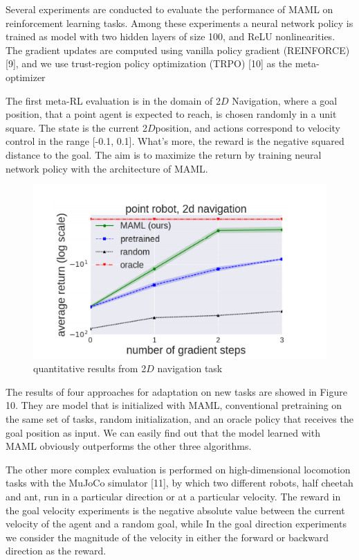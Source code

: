 Several experiments are conducted to evaluate the performance of MAML on reinforcement learning tasks. Among these experiments a neural network policy is trained as model with  two hidden layers of size 100, and ReLU nonlinearities. The gradient updates are computed using vanilla policy gradient (REINFORCE) [9], and we use trust-region policy optimization (TRPO) [10] as the meta-optimizer

The first meta-RL evaluation is in the domain of 2$D$ Navigation, where  a goal position, that a point agent is expected to reach, is chosen randomly in a unit square. The state is the current 2$D$position, and actions correspond to velocity control in the range [-0.1, 0.1]. What's more, the reward is the negative squared distance to the goal. The aim is to maximize the return by training neural network policy with the architecture of MAML.

\begin{figure}[H]
	\includegraphics[scale=0.8]{MAML_04.PNG}
	\centering
	\caption{ quantitative results from 2$D$ navigation task}
	\label{MAML}
\end{figure}

The results of four approaches for adaptation on new tasks are showed in Figure 10. They are model that is initialized with MAML, conventional pretraining on the same set of tasks, random initialization, and an oracle policy that receives the goal position as input. We can easily find out that the model learned with MAML obviously outperforms the other three algorithms.

The other more complex evaluation is performed on high-dimensional locomotion tasks with the MuJoCo simulator [11], by which two different robots, half  cheetah and ant, run in a particular direction or at a particular velocity. The reward in the goal velocity experiments is the negative absolute value between the current velocity of
the agent and a random goal, while In the goal direction experiments we consider the magnitude of the velocity in either the forward or backward direction as the reward.

